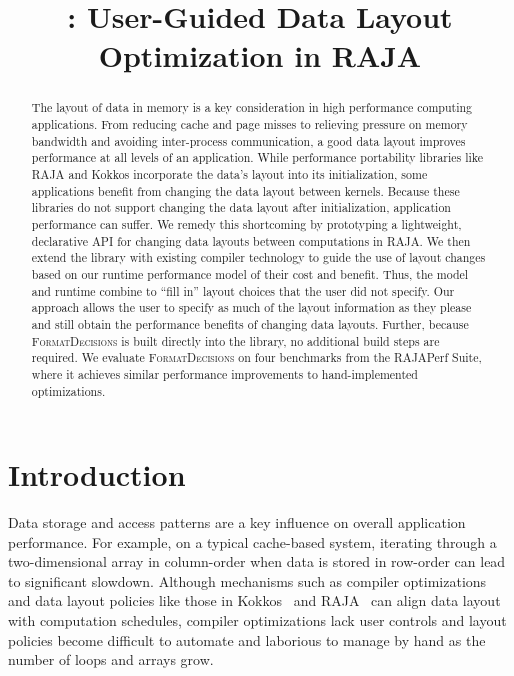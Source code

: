 \documentclass[sigconf,review=true]{acmart}
\title{\FormatDecisions{}: User-Guided Data Layout Optimization in RAJA}
\newcommand{\FormatDecisions}[0]{{\textsc{FormatDecisions}}}
\begin{document}
\begin{abstract}

The layout of data in memory is a key consideration in high performance computing applications.
From reducing cache and page misses to relieving pressure on memory bandwidth and avoiding inter-process communication, a good data layout improves performance at all levels of an application.
While performance portability libraries like RAJA and Kokkos incorporate the data's layout into its initialization, some applications benefit from changing the data layout between kernels.
Because these libraries do not support changing the data layout after initialization, application performance can suffer. 
We remedy this shortcoming by prototyping a lightweight, declarative API for changing data layouts between computations in RAJA.
We then extend the library with existing compiler technology to guide the use of layout changes based on our runtime performance model of their cost and benefit.
Thus, the model and runtime combine to \enquote{fill in} layout choices that the user did not specify.
Our approach allows the user to specify as much of the layout information as they please and still obtain the performance benefits of changing data layouts.  
Further, because \FormatDecisions{} is built directly into the library, no additional build steps are required.
We evaluate \FormatDecisions{} on four benchmarks from the RAJAPerf Suite, where it achieves similar performance improvements to hand-implemented optimizations.
\end{abstract}
\maketitle
\def\@textbottom{\vskip \z@ \@plus 1pt}




\section{Introduction}
Data storage and access patterns are a key influence on overall application performance. 
For example, on a typical cache-based system, iterating through a two-dimensional array in column-order when data is stored in row-order can lead to significant slowdown. 
Although mechanisms such as compiler optimizations~\cite{wolf1991data,bixby1994automatic}
and data layout policies like those in Kokkos~\cite{edwards2014kokkos} and RAJA~\cite{hornung2014RAJA} can align data layout with computation schedules, compiler optimizations lack user controls and layout policies become difficult to automate and laborious to manage by hand as the number of loops and arrays grow.
\end{document}

